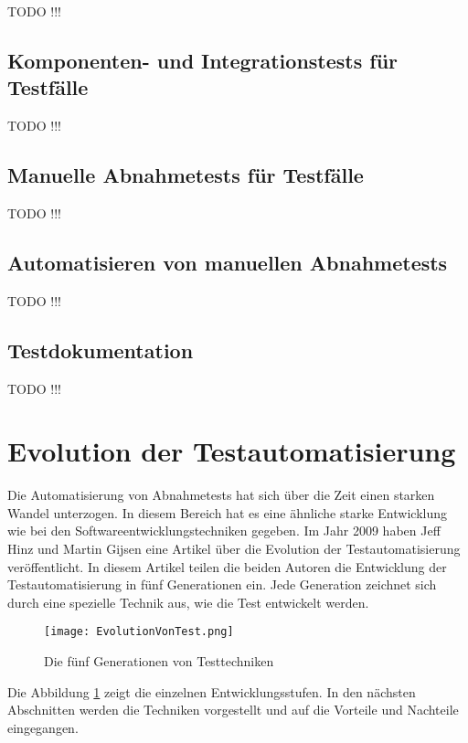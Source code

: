 TODO !!!

\subsection{Komponenten- und Integrationstests für Testfälle}

TODO !!!

\subsection{Manuelle Abnahmetests für Testfälle}

TODO !!!

\subsection{Automatisieren von manuellen Abnahmetests}

TODO !!!

\subsection{Testdokumentation}

TODO !!!

\section{Evolution der Testautomatisierung}

Die Automatisierung von Abnahmetests hat sich über die Zeit einen starken Wandel unterzogen. In diesem Bereich hat es eine ähnliche starke Entwicklung wie bei den Softwareentwicklungstechniken gegeben. Im Jahr 2009 haben Jeff Hinz und Martin Gijsen eine Artikel \cite{Hinz09} über die Evolution der Testautomatisierung veröffentlicht. In diesem Artikel teilen die beiden Autoren die Entwicklung der Testautomatisierung in fünf Generationen ein. Jede Generation zeichnet sich durch eine spezielle Technik aus, wie die Test entwickelt werden. 

\begin{figure}
\centering
\texttt{[image: EvolutionVonTest.png]}
\caption{Die fünf Generationen von Testtechniken}
\label{fig:testEvolution}
\end{figure}

\SuperPar
Die Abbildung \ref{fig:testEvolution} zeigt die einzelnen Entwicklungsstufen. In den nächsten Abschnitten werden die Techniken vorgestellt und auf die Vorteile und Nachteile eingegangen.

